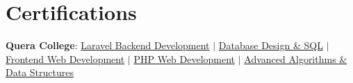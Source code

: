 \documentclass[letterpaper,11pt]{article}
\begin{document}
\section{Certifications}
\begin{itemize}[leftmargin=0.15in, label={}]
\small{
\item{
\textbf{Quera College}{: }
\href{https://quera.org/certificate/TcQVQ4I4/}{\color{DeepNavy}Laravel Backend Development} $|$
\href{https://quera.org/certificate/r3OmlCz9/}{\color{DeepNavy}Database Design \& SQL} $|$
\href{https://quera.org/certificate/S9oxW8QS/}{\color{DeepNavy}Frontend Web Development} $|$
\href{https://quera.org/certificate/nM3gJ7OA/}{\color{DeepNavy}PHP Web Development} $|$
\href{https://quera.org/certificate/FlPv2wwu/}{\color{DeepNavy}Advanced Algorithms \& Data Structures}
}}
\end{itemize}

\end{document}
